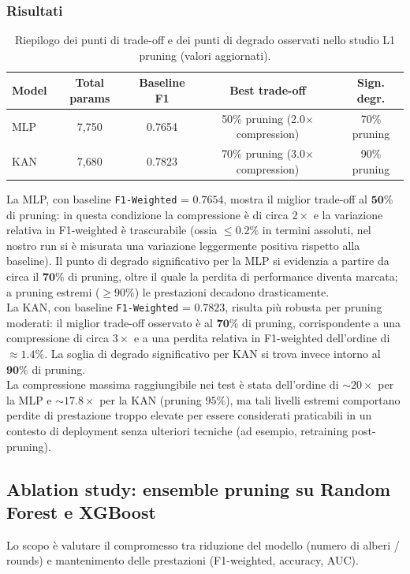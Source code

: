 \documentclass[a4paper,12pt]{report}
\begin{document}
	\subsubsection{Risultati}
	\begin{table}[H]
		\centering
		\setlength{\tabcolsep}{4pt}
		\begin{tabular}{lcccc}
			\toprule
			\textbf{Model} & \textbf{Total params} & \textbf{Baseline F1} & \textbf{Best trade-off} & \textbf{Sign. degr.} \\
			\midrule
			MLP & 7,750   & 0.7654 & 50\% pruning (2.0$\times$ compression) & 70\% pruning \\
			KAN & 7,680   & 0.7823 & 70\% pruning (3.0$\times$ compression) & 90\% pruning \\
			\bottomrule
		\end{tabular}
		\caption{Riepilogo dei punti di trade-off e dei punti di degrado osservati nello studio L1 pruning (valori aggiornati).}
	\end{table}
	
	La MLP, con baseline \texttt{F1-Weighted} = \(\mathbf{0.7654}\), mostra il miglior trade-off al \(\mathbf{50\%}\) di pruning: in questa condizione la compressione è di circa \(2\times\) e la variazione relativa in F1-weighted è trascurabile (ossia \(\le 0.2\%\) in termini assoluti, nel nostro run si è misurata una variazione leggermente positiva rispetto alla baseline). Il punto di degrado significativo per la MLP si evidenzia a partire da circa il \(\mathbf{70\%}\) di pruning, oltre il quale la perdita di performance diventa marcata; a pruning estremi (\(\ge 90\%\)) le prestazioni decadono drasticamente. \\
	La KAN, con baseline \texttt{F1-Weighted} = \(\mathbf{0.7823}\), risulta più robusta per pruning moderati: il miglior trade-off osservato è al \(\mathbf{70\%}\) di pruning, corrispondente a una compressione di circa \(3\times\) e a una perdita relativa in F1-weighted dell'ordine di \(\approx 1.4\%\). La soglia di degrado significativo per KAN si trova invece intorno al \(\mathbf{90\%}\) di pruning. \\
	La compressione massima raggiungibile nei test è stata dell'ordine di $\sim 20\times$ per la MLP e $\sim 17.8\times$ per la KAN (pruning $95\%$), ma tali livelli estremi comportano perdite di prestazione troppo elevate per essere considerati praticabili in un contesto di deployment senza ulteriori tecniche (ad esempio, retraining post-pruning).
	
	\subsection{Ablation study: ensemble pruning su Random Forest e XGBoost}
	Lo scopo è valutare il compromesso tra riduzione del modello (numero di alberi / rounds) e mantenimento delle prestazioni (F1-weighted, accuracy, AUC).
	
\end{document}
